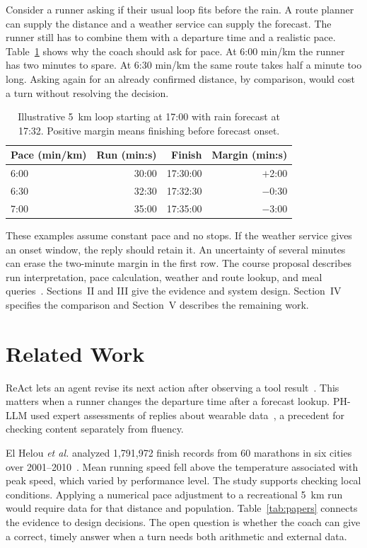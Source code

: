 \documentclass[conference]{IEEEtran}
\begin{document}
Consider a runner asking if their usual loop fits before the rain. A route planner can supply the distance and a weather service can supply the forecast. The runner still has to combine them with a departure time and a realistic pace. Table~\ref{tab:margin} shows why the coach should ask for pace. At 6:00 min/km the runner has two minutes to spare. At 6:30 min/km the same route takes half a minute too long. Asking again for an already confirmed distance, by comparison, would cost a turn without resolving the decision.

\begin{table}[!b]
\caption{Illustrative 5~km loop starting at 17:00 with rain forecast at 17:32. Positive margin means finishing before forecast onset.}
\label{tab:margin}\centering\small
\begin{tabular}{@{}lrrr@{}}\toprule
Pace (min/km) & Run (min:s) & Finish & Margin (min:s)\\\midrule
6:00 & 30:00 & 17:30:00 & $+$2:00\\
6:30 & 32:30 & 17:32:30 & $-$0:30\\
7:00 & 35:00 & 17:35:00 & $-$3:00\\\bottomrule
\end{tabular}
\end{table}
These examples assume constant pace and no stops. If the weather service gives an onset window, the reply should retain it. An uncertainty of several minutes can erase the two-minute margin in the first row.
The course proposal describes run interpretation, pace calculation, weather and route lookup, and meal queries~\cite{proposal}. Sections~II and III give the evidence and system design. Section~IV specifies the comparison and Section~V describes the remaining work.

\section{Related Work}
ReAct lets an agent revise its next action after observing a tool result~\cite{react}. This matters when a runner changes the departure time after a forecast lookup. PH-LLM used expert assessments of replies about wearable data~\cite{phllm}, a precedent for checking content separately from fluency.

El Helou \emph{et al.} analyzed 1,791,972 finish records from 60 marathons in six cities over 2001--2010~\cite{heat}. Mean running speed fell above the temperature associated with peak speed, which varied by performance level. The study supports checking local conditions. Applying a numerical pace adjustment to a recreational 5~km run would require data for that distance and population. Table~\ref{tab:papers} connects the evidence to design decisions. The open question is whether the coach can give a correct, timely answer when a turn needs both arithmetic and external data.
\end{document}
